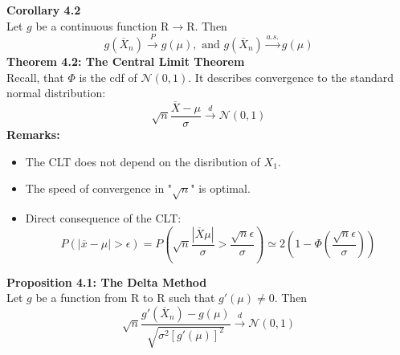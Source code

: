 \documentclass[12pt,a4paper,draft]{report}
\begin{document}
\textbf{Corollary 4.2}\\
Let $g$ be a continuous function $\mathrm{R}\to\mathrm{R}$. Then
\begin{equation}
g(\overline{X}_n)\overset{P}\to g(\mu),\text{ and }g(\overline{X}_n)\overset{a.s.}\to g(\mu)
\end{equation}
\textbf{Theorem 4.2: The Central Limit Theorem}\\
Recall, that $\Phi$ is the cdf of $\mathcal{N}(0,1)$. It describes convergence to the standard normal distribution:
\begin{equation}
\sqrt{n}\frac{\overline{X}-\mu}{\sigma}\overset{d}\to\mathcal{N}(0,1)
\end{equation}
\textbf{Remarks:}
\begin{itemize}
\setlength\itemsep{0em}
\item The CLT does not depend on the disribution of $X_1$.
\item The speed of convergence in "$\sqrt{n}$" is optimal.
\item Direct consequence of the CLT:
\begin{equation}
P(|\overline{x}-\mu|>\epsilon)=P\left(\sqrt{n}\frac{|\overline{X}\mu|}{\sigma}>\frac{\sqrt{n}\epsilon}{\sigma}\right)\simeq 2\left(1-\Phi\left(\frac{\sqrt{n}\epsilon}{\sigma}\right)\right)
\end{equation}
\end{itemize}
\textbf{Proposition 4.1: The Delta Method}\\
Let $g$ be a function from $\mathrm{R}$ to $\mathrm{R}$ such that $g'(\mu)\neq0$. Then
\begin{equation}
\sqrt{n}\dfrac{g'(\overline{X}_n)-g(\mu)}{\sqrt{\sigma^2[g'(\mu)]^2}}\overset{d}\to\mathcal{N}(0,1)
\end{equation}
\end{document}
